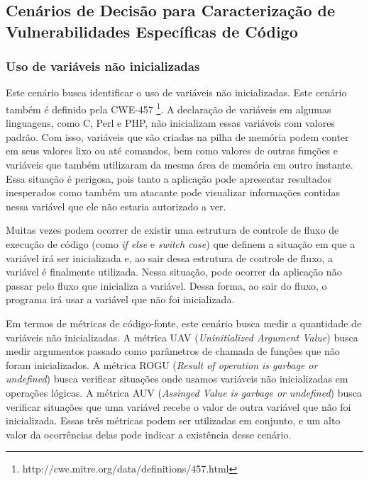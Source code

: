 \subsection{Cenários de Decisão para Caracterização de Vulnerabilidades Específicas de Código}

\subsubsection{Uso de variáveis não inicializadas}

Este cenário busca identificar o uso de variáveis não inicializadas. Este cenário também é definido pela CWE-457 \footnote{http://cwe.mitre.org/data/definitions/457.html}.
%
A declaração de variáveis em algumas linguagens, como C, Perl e PHP, não inicializam essas variáveis com valores padrão. Com isso, variáveis que são criadas na pilha de memória podem conter em seus valores lixo ou até comandos, bem como valores de outras funções e variáveis que também utilizaram da mesma área de memória em outro instante.
%
Essa situação é perigosa, pois tanto a aplicação pode apresentar resultados inesperados como também um atacante pode visualizar informações contidas nessa variável que ele não estaria autorizado a ver. 

Muitas vezes podem ocorrer de existir uma estrutura de controle de fluxo de execução de código (como \emph{if else} e \emph{switch case}) que definem a situação em que a variável irá ser inicializada e, ao sair dessa estrutura de controle de fluxo, a variável é finalmente utilizada. Nessa situação, pode ocorrer da aplicação não passar pelo fluxo que inicializa a variável. Dessa forma, ao sair do fluxo, o programa irá usar a variável que não foi inicializada.

Em termos de métricas de código-fonte, este cenário busca medir a quantidade de variáveis não inicializadas. A métrica UAV (\emph{Uninitialized Argument Value}) busca medir argumentos passado como parâmetros de chamada de funções que não foram inicializados. A métrica ROGU (\emph{Result of operation is garbage or undefined}) busca verificar situações onde usamos variáveis não inicializadas em operações lógicas. A métrica AUV (\emph{Assinged Value is garbage or undefined}) busca verificar situações que uma variável recebe o valor de outra variável que não foi inicializada. Essas três métricas podem ser utilizadas em conjunto, e um alto valor da ocorrências delas pode indicar a existência desse cenário.


